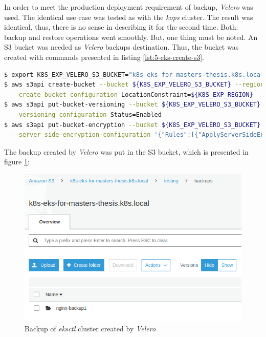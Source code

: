 In order to meet the production deployment requirement of backup, \textit{Velero} was used. The identical use case was tested as with the \textit{kops} cluster. The result was identical, thus, there is no sense in describing it for the second time. Both: backup and restore operations went smoothly. But, one thing must be noted. An S3 bucket was needed as \textit{Velero} backups destination. Thus, the bucket was created with commands presented in listing \ref{lst:5-eks-create-s3}.
\begin{lstlisting}[basicstyle=\scriptsize,xleftmargin=0cm,label=lst:5-eks-create-s3,caption={Creating an S3 bucket for \textit{Velero}},captionpos=b,language=Bash ]
$ export K8S_EXP_VELERO_S3_BUCKET="k8s-eks-for-masters-thesis.k8s.local"
$ aws s3api create-bucket --bucket ${K8S_EXP_VELERO_S3_BUCKET} --region ${K8S_EXP_REGION} \
  --create-bucket-configuration LocationConstraint=${K8S_EXP_REGION}
$ aws s3api put-bucket-versioning --bucket ${K8S_EXP_VELERO_S3_BUCKET} \
  --versioning-configuration Status=Enabled
$ aws s3api put-bucket-encryption --bucket ${K8S_EXP_VELERO_S3_BUCKET} \
  --server-side-encryption-configuration '{"Rules":[{"ApplyServerSideEncryptionByDefault":{"SSEAlgorithm":"AES256"}}]}'
\end{lstlisting}
The backup created by \textit{Velero} was put in the S3 bucket, which is presented in figure \ref{velero-backup}:
\begin{figure}[H]
    \centering
    \includegraphics[width=14cm]{figures/eks-backup.png}
    \captionsetup{justification=centering,margin=2cm}
    \caption{Backup of \textit{eksctl} cluster created by \textit{Velero}}
    \label{velero-backup}
\end{figure}

